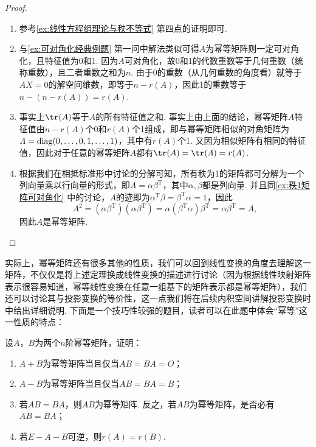 \begin{proof}
    \begin{enumerate}
        \item 参考\autoref{ex:线性方程组理论与秩不等式} 第四点的证明即可.

        \item 与\autoref{ex:可对角化经典例题} 第一问中解法类似可得$A$为幂等矩阵则一定可对角化，且特征值为0和1. 因为$A$可对角化，故0和1的代数重数等于几何重数（统称重数），且二者重数之和为$n$. 由于0的重数（从几何重数的角度看）就等于$AX=0$的解空间维数，即等于$n-r(A)$，因此1的重数等于$n-(n-r(A))=r(A)$.

        \item 事实上$\tr(A)$等于$A$的所有特征值之和. 事实上由上面的结论，幂等矩阵$A$特征值由$n-r(A)$个0和$r(A)$个1组成，即与幂等矩阵相似的对角矩阵为$\varLambda=\operatorname{diag}(0,\ldots,0,1,\ldots,1)$，其中有$r(A)$个1. 又因为相似矩阵有相同的特征值，因此对于任意的幂等矩阵$A$都有$\tr(A)=\tr(\varLambda)=r(A)$.

        \item 根据我们在相抵标准形中讨论的分解可知，所有秩为1的矩阵都可分解为一个列向量乘以行向量的形式，即$A=\alpha\beta^\mathrm{T}$，其中$\alpha,\beta$都是列向量. 并且同\autoref{ex:秩1矩阵可对角化} 中的讨论，$A$的迹即为$\alpha^\mathrm{T}\beta=\beta^\mathrm{T}\alpha=1$，因此
              \[A^2=(\alpha\beta^\mathrm{T})(\alpha\beta^\mathrm{T})=\alpha(\beta^\mathrm{T}\alpha)\beta^\mathrm{T}=\alpha\beta^\mathrm{T}=A,\]
              因此$A$是幂等矩阵.
    \end{enumerate}
\end{proof}

实际上，幂等矩阵还有很多其他的性质，我们可以回到线性变换的角度去理解这一矩阵，不仅仅是将上述定理换成线性变换的描述进行讨论（因为根据线性映射矩阵表示很容易知道，幂等线性变换在任意一组基下的矩阵表示都是幂等矩阵），我们还可以讨论其与投影变换的等价性，这一点我们将在后续内积空间讲解投影变换时中给出详细说明. 下面是一个技巧性较强的题目，读者可以在此题中体会``幂等''这一性质的特点：
\begin{example}{}{}
    设$A$，$B$为两个$n$阶幂等矩阵，证明：
    \begin{enumerate}
        \item $A+B$为幂等矩阵当且仅当$AB=BA=O$；

        \item $A-B$为幂等矩阵当且仅当$AB=BA=B$；

        \item 若$AB=BA$，则$AB$为幂等矩阵. 反之，若$AB$为幂等矩阵，是否必有$AB=BA$；

        \item 若$E-A-B$可逆，则$r(A)=r(B)$.
    \end{enumerate}
\end{example}

